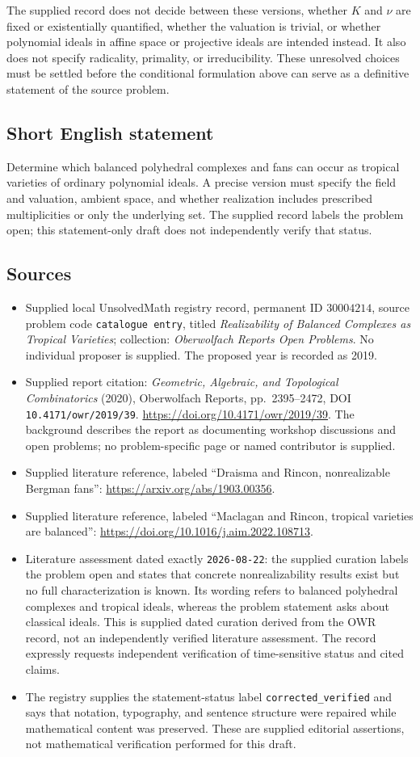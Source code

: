 \documentclass[11pt]{article}
\begin{document}
The supplied record does not decide between these versions, whether \(K\) and \(\nu\) are fixed or existentially quantified, whether the valuation is trivial, or whether polynomial ideals in affine space or projective ideals are intended instead. It also does not specify radicality, primality, or irreducibility. These unresolved choices must be settled before the conditional formulation above can serve as a definitive statement of the source problem.
\subsection{Short English statement}
Determine which balanced polyhedral complexes and fans can occur as tropical varieties of ordinary polynomial ideals. A precise version must specify the field and valuation, ambient space, and whether realization includes prescribed multiplicities or only the underlying set. The supplied record labels the problem open; this statement-only draft does not independently verify that status.
\subsection{Sources}
\begin{itemize}
\item Supplied local UnsolvedMath registry record, permanent ID \(30004214\), source problem code \texttt{catalogue entry}, titled \emph{Realizability of Balanced Complexes as Tropical Varieties}; collection: \emph{Oberwolfach Reports Open Problems}. No individual proposer is supplied. The proposed year is recorded as 2019.
\item Supplied report citation: \emph{Geometric, Algebraic, and Topological Combinatorics} (2020), Oberwolfach Reports, pp.~2395--2472, DOI \texttt{10.4171/owr/2019/39}. \url{https://doi.org/10.4171/owr/2019/39}. The background describes the report as documenting workshop discussions and open problems; no problem-specific page or named contributor is supplied.
\item Supplied literature reference, labeled ``Draisma and Rincon, nonrealizable Bergman fans'': \url{https://arxiv.org/abs/1903.00356}.
\item Supplied literature reference, labeled ``Maclagan and Rincon, tropical varieties are balanced'': \url{https://doi.org/10.1016/j.aim.2022.108713}.
\item Literature assessment dated exactly \texttt{2026-08-22}: the supplied curation labels the problem open and states that concrete nonrealizability results exist but no full characterization is known. Its wording refers to balanced polyhedral complexes and tropical ideals, whereas the problem statement asks about classical ideals. This is supplied dated curation derived from the OWR record, not an independently verified literature assessment. The record expressly requests independent verification of time-sensitive status and cited claims.
\item The registry supplies the statement-status label \texttt{corrected\_verified} and says that notation, typography, and sentence structure were repaired while mathematical content was preserved. These are supplied editorial assertions, not mathematical verification performed for this draft.
\end{itemize}
\end{document}

